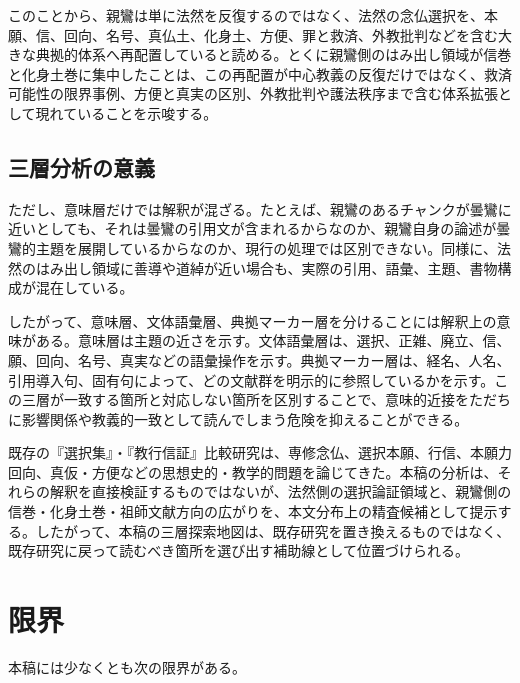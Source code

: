\documentclass[uplatex,dvipdfmx,11pt,a4paper]{jsarticle}
\begin{document}
このことから、親鸞は単に法然を反復するのではなく、法然の念仏選択を、本願、信、回向、名号、真仏土、化身土、方便、罪と救済、外教批判などを含む大きな典拠的体系へ再配置していると読める。とくに親鸞側のはみ出し領域が信巻と化身土巻に集中したことは、この再配置が中心教義の反復だけではなく、救済可能性の限界事例、方便と真実の区別、外教批判や護法秩序まで含む体系拡張として現れていることを示唆する。

\subsection{三層分析の意義}

ただし、意味層だけでは解釈が混ざる。たとえば、親鸞のあるチャンクが曇鸞に近いとしても、それは曇鸞の引用文が含まれるからなのか、親鸞自身の論述が曇鸞的主題を展開しているからなのか、現行の処理では区別できない。同様に、法然のはみ出し領域に善導や道綽が近い場合も、実際の引用、語彙、主題、書物構成が混在している。

したがって、意味層、文体語彙層、典拠マーカー層を分けることには解釈上の意味がある。意味層は主題の近さを示す。文体語彙層は、選択、正雑、廃立、信、願、回向、名号、真実などの語彙操作を示す。典拠マーカー層は、経名、人名、引用導入句、固有句によって、どの文献群を明示的に参照しているかを示す。この三層が一致する箇所と対応しない箇所を区別することで、意味的近接をただちに影響関係や教義的一致として読んでしまう危険を抑えることができる。

既存の『選択集』・『教行信証』比較研究は、専修念仏、選択本願、行信、本願力回向、真仮・方便などの思想史的・教学的問題を論じてきた。本稿の分析は、それらの解釈を直接検証するものではないが、法然側の選択論証領域と、親鸞側の信巻・化身土巻・祖師文献方向の広がりを、本文分布上の精査候補として提示する。したがって、本稿の三層探索地図は、既存研究を置き換えるものではなく、既存研究に戻って読むべき箇所を選び出す補助線として位置づけられる。

\section{限界}

本稿には少なくとも次の限界がある。
\end{document}
